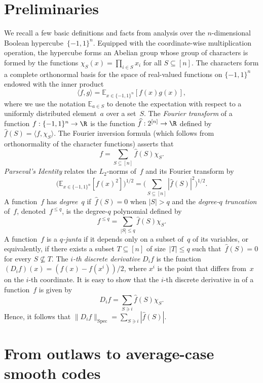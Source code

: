 \documentclass{toc}
\newcommand{\pmset}[1]{\{-1,1\}^{#1}} %
\newcommand{\Exp}{{\mathbb{E}}}
\DeclareMathOperator{\spec}{Spec}
\newcommand{\beqn}{\begin{equation*}}
\newcommand{\eeqn}{\end{equation*}}
\begin{document}
%
\section{Preliminaries}
\label{sec:prelims}

We recall a few basic definitions and facts from  analysis over the $n$-dimensional Boolean hypercube~$\pmset{n}$.
Equipped with the coordinate-wise multiplication operation, the hypercube forms an Abelian group whose group of characters is formed by the functions $\chi_S(x) = \prod_{i\in S}x_i$ for all  $S\subseteq[n]$.
The characters form a complete orthonormal basis for the space of real-valued functions on $\pmset{n}$ endowed with the inner product
\[
  \langle f,g\rangle = \Exp_{x\in\pmset{n}}[f(x)g(x)],
\]
where we use the notation $\Exp_{a\in S}$ to denote the expectation with respect to a uniformly distributed element~$a$ over a set~$S$.
The \emph{Fourier transform} of a function $f:\pmset{n}\to\R$ is the function $\widehat f:2^{[n]}\to \R$ defined by $\widehat{f}(S) = \langle f,\chi_S\rangle$.
The Fourier inversion formula (which follows from orthonormality of the character functions) asserts that
\beqn
f = \sum_{S\subseteq [n]} \widehat{f}(S)\chi_S.
\eeqn
\emph{Parseval's Identity} relates the $L_2$-norms of~$f$ and its Fourier transform by
\beqn
\big(\Exp_{x\in\pmset{n}}[f(x)^2]\big)^{1/2}
=
\Big(\sum_{S\subseteq [n]}|\widehat{f}(S)|^2\Big)^{1/2}.
\eeqn
A function~$f$ has \emph{degree}~$q$ if~$\widehat{f}(S) = 0$ when $|S| > q$ and
the \emph{degree-$q$ truncation} of~$f$, denoted~$f^{\le q}$, is the degree-$q$ polynomial defined by
\beqn
f^{\le q}=\sum_{|S|\le q}\widehat{f}(S)\chi_S.
\eeqn 
A function~$f$ is a \emph{$q$-junta} if it depends only on a subset of~$q$ of its variables, or equivalently, if there exists a subset $T\subseteq [n]$ of size~$|T|\leq q$ such that~$\widehat{f}(S) = 0$ for every $S\not\subseteq T$. The \emph{$i$-th %
discrete derivative} $D_if$ is the function $(D_if)(x) = (f(x) - f(x^i))/2$, where $x^i$ is the point that differs from~$x$ on the $i$-th %
coordinate.
It is easy to show that the $i$-th %
discrete derivative in of a function~$f$ is given by
\beqn
D_if = \sum_{S\ni i} \widehat{f}(S) \chi_S.
\eeqn
Hence, it follows that $\|D_if\|_{\spec} = \sum_{S\ni i}|\widehat f(S)|$.

%
\section{From outlaws to average-case smooth codes}
\label{sec:outlaw2smoothcode}
\end{document}
